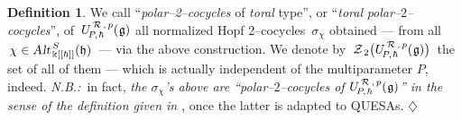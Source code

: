 \documentclass[12pt,reqno,twoside,a4paper]{amsart}
\numberwithin{equation}{section}
\theoremstyle{definition}
\newtheorem{definition}[lema]{Definition}
\newtheorem{free text}[lema]{}
\theoremstyle{remark}
\newcommand{\R}{{\mathcal R}}
\newcommand{\Z}{{\mathcal Z}}
\def \kh{{\Bbbk[[\hbar]]}}
\def \lieg{\mathfrak{g}}
\def \lieh{\mathfrak{h}}
\def \uRpPhg{U^{\,\R\,,\,p}_{\!P,\hskip0,7pt\hbar}(\hskip0,5pt\lieg)}
\theoremstyle{plain}
\begin{document}
\vskip7pt

\begin{definition}   \label{def: sigma_formal}
%
 We call  ``\textit{polar--2--cocycles\/}  of  \textsl{toral\/}  type'', or ``\textsl{toral}  \textit{polar--$ 2 $--cocy\-cles\/}'',  of  $ \, \uRpPhg $  all normalized Hopf 2--cocycles  $ \, \sigma_\chi $  obtained
 --- from all  $ \, \chi \in \text{\sl Alt}^{\,S}_{\,\kh}(\lieh) \, $  ---   via the above construction.  We denote by  $ \, \Z_{\,2}\big( \uRpPhg \big) \, $  the set of all of them   --- which is actually independent of the multiparameter  $ P $,  indeed.
%
 \vskip3pt
%
   \textsl{N.B.:}\,  in fact,  \textsl{the  $ \sigma_\chi $'s  above are ``polar--$ 2 $--cocycles  of  $ \uRpPhg $''  in the sense of the definition given in  \cite{GG4}},  once the latter is adapted to QUESAs.   \hfill  $ \diamondsuit $
%
\end{definition}

\vskip7pt
\end{document}
